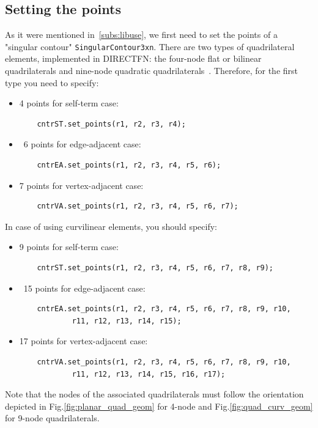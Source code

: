 \documentclass[a4wide,11pt]{article}
\renewcommand{\[}{\begin{equation}}
\renewcommand{\]}{\end{equation}}
\renewcommand{\{}{\begin{eqnarray}}
\renewcommand{\}}{\end{eqnarray}}
\begin{document}
\subsection{Setting the points}
As it were mentioned in~\ref{subs:libuse}, we first need to set the points of a "singular contour" \texttt{SingularContour3xn}. There are two types of quadrilateral elements, implemented in DIRECTFN: the four-node flat or bilinear quadrilaterals and nine-node quadratic quadrilaterals~\cite{Kolundzija_book}. Therefore, for the first type you need to specify:
\begin{itemize}
	\item 
	4 points for self-term case:
	\begin{verbatim}
	cntrST.set_points(r1, r2, r3, r4);
	\end{verbatim} 
	\item\
	6 points for edge-adjacent case:
	\begin{verbatim}
	cntrEA.set_points(r1, r2, r3, r4, r5, r6);
	\end{verbatim} 
	\item 
	7 points for vertex-adjacent case:
	\begin{verbatim}
	cntrVA.set_points(r1, r2, r3, r4, r5, r6, r7);
	\end{verbatim} 
\end{itemize}
In case of using curvilinear elements, you should specify:
\begin{itemize}
	\item 
	9 points for self-term case:
	\begin{verbatim}
	cntrST.set_points(r1, r2, r3, r4, r5, r6, r7, r8, r9);
	\end{verbatim} 
	\item\
	15 points for edge-adjacent case:
	\begin{verbatim}
	cntrEA.set_points(r1, r2, r3, r4, r5, r6, r7, r8, r9, r10,
	        r11, r12, r13, r14, r15);
	\end{verbatim} 
	\item 
	17 points for vertex-adjacent case:
	\begin{verbatim}
	cntrVA.set_points(r1, r2, r3, r4, r5, r6, r7, r8, r9, r10, 
	        r11, r12, r13, r14, r15, r16, r17);
	\end{verbatim} 
\end{itemize}
Note that the nodes of the associated quadrilaterals must follow the orientation depicted in Fig.\ref{fig:planar_quad_geom} for 4-node and Fig.\ref{fig:quad_curv_geom} for 9-node quadrilaterals.
\end{document}
